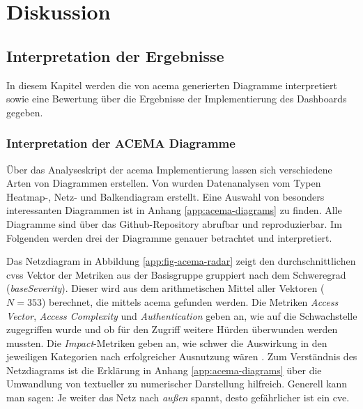 \chapter{Diskussion}
\label{chap:diskussion}
\section{Interpretation der Ergebnisse}
\label{sec:interpretation}
In diesem Kapitel werden die von \gls{acema} generierten Diagramme interpretiert sowie eine Bewertung über die Ergebnisse der Implementierung des Dashboards gegeben.
\subsection{Interpretation der ACEMA Diagramme}
\label{sec:interpretation-acema}
Über das Analyseskript der \gls{acema} Implementierung lassen sich verschiedene Arten von Diagrammen erstellen. Von \citeauthor{klementSecuring6GTransition2024} wurden Datenanalysen vom Typen Heatmap-, Netz- und Balkendiagram erstellt. Eine Auswahl von besonders interessanten Diagrammen ist in Anhang \ref{app:acema-diagrams} zu finden. Alle Diagramme sind über das Github-Repository \autocite{jesseDumpeldownAcema_oranDev} abrufbar und reproduzierbar. Im Folgenden werden drei der Diagramme genauer betrachtet und interpretiert.
\par Das Netzdiagram in Abbildung \ref{app:fig-acema-radar} zeigt den durchschnittlichen \gls{cvss} Vektor der Metriken aus der Basisgruppe gruppiert nach dem Schweregrad (\textit{baseSeverity}). Dieser wird aus dem arithmetischen Mittel aller Vektoren (\(N = 353\)) berechnet, die mittels \gls{acema} gefunden werden. Die Metriken \textit{Access Vector}, \textit{Access Complexity} und \textit{Authentication} geben an, wie auf die Schwachstelle zugegriffen wurde und ob für den Zugriff weitere Hürden überwunden werden mussten. Die \textit{Impact}-Metriken geben an, wie schwer die Auswirkung in den jeweiligen Kategorien nach erfolgreicher Ausnutzung wären \autocite{CVSSV2Complete}. Zum Verständnis des Netzdiagrams ist die Erklärung in Anhang \ref{app:acema-diagrams} über die Umwandlung von textueller zu numerischer Darstellung hilfreich. Generell kann man sagen: Je weiter das Netz nach \textit{außen} spannt, desto gefährlicher ist ein \gls{cve}. 
